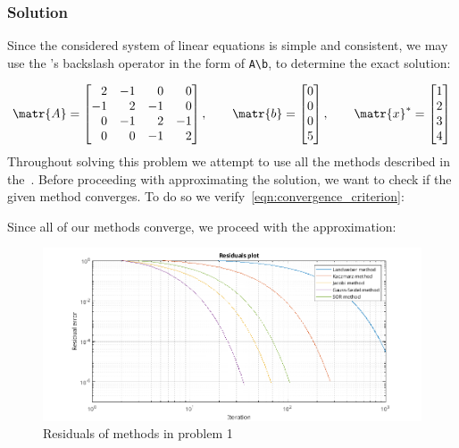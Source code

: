\subsubsection*{Solution}
Since the considered system of linear equations is simple and consistent, we may use the
\MATLAB's backslash operator in the form of \lstinline[style=Matlab-editor]{A\b}, to
determine the exact solution:

\begin{equation*}
  \matr{A} = \begin{bmatrix}
    \phantom{-}2 & -1 & \phantom{-}0 & \phantom{-}0 \\
    -1 & \phantom{-}2 & -1 & \phantom{-}0 \\
    \phantom{-}0 & -1 & \phantom{-}2 & -1 \\
    \phantom{-}0 & \phantom{-}0 & -1 & \phantom{-}2
  \end{bmatrix}, \qquad
  \matr{b} = \begin{bmatrix}
    0 \\
    0 \\
    0 \\
    5
  \end{bmatrix}, \qquad
  \matr{x}^* = \begin{bmatrix}
    1 \\
    2 \\
    3 \\
    4
  \end{bmatrix}
\end{equation*}
Throughout solving this problem we attempt to use all the methods described in
the~.
Before proceeding with approximating the solution, we want to check if the given method
converges.
To do so we verify~\autoref{eqn:convergence_criterion}:

Since all of our methods converge, we proceed with the approximation:

\begin{figure}[H]
  \centering
  \includegraphics[width=1\textwidth]{images/Residuals_Problem1.png}
  \caption{Residuals of methods in problem 1}
\end{figure}

